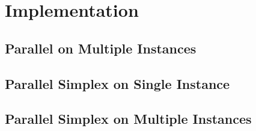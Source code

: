 \section{Implementation}
\subsection{Parallel on Multiple Instances}

\subsection{Parallel Simplex on Single Instance}

\subsection{Parallel Simplex on Multiple Instances}